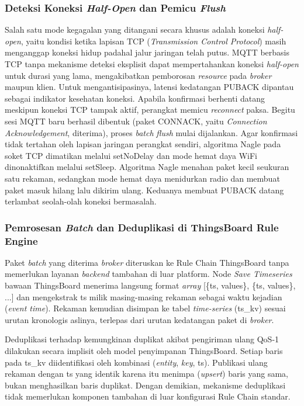 \subsubsection{Deteksi Koneksi \textit{Half-Open} dan Pemicu \textit{Flush}}

Salah satu mode kegagalan yang ditangani secara khusus adalah koneksi \textit{half-open},
yaitu kondisi ketika lapisan TCP (\textit{Transmission Control Protocol}) masih menganggap koneksi hidup padahal jalur jaringan
telah putus. MQTT berbasis TCP tanpa mekanisme deteksi eksplisit dapat mempertahankan
koneksi \textit{half-open} untuk durasi yang lama, mengakibatkan pemborosan \textit{resource} pada
\textit{broker} maupun klien. Untuk mengantisipasinya, latensi kedatangan PUBACK dipantau sebagai
indikator kesehatan koneksi. Apabila konfirmasi berhenti datang meskipun koneksi TCP
tampak aktif, perangkat memicu \textit{reconnect} paksa. Begitu sesi MQTT baru berhasil
dibentuk (paket CONNACK, yaitu \textit{Connection Acknowledgement}, diterima), proses \textit{batch} \textit{flush} mulai
dijalankan. Agar konfirmasi tidak tertahan oleh lapisan jaringan perangkat sendiri,
algoritma Nagle pada soket TCP dimatikan melalui setNoDelay dan mode hemat daya WiFi
dinonaktifkan melalui setSleep. Algoritma Nagle menahan paket kecil seukuran satu
rekaman, sedangkan mode hemat daya menidurkan radio dan membuat paket masuk hilang
lalu dikirim ulang. Keduanya membuat PUBACK datang terlambat seolah-olah
koneksi bermasalah.

\subsubsection{Pemrosesan \textit{Batch} dan Deduplikasi di ThingsBoard Rule Engine}

Paket \textit{batch} yang diterima \textit{broker} diteruskan ke Rule Chain ThingsBoard tanpa memerlukan
layanan \textit{backend} tambahan di luar platform. Node \textit{Save Timeseries} bawaan
ThingsBoard menerima langsung format \textit{array} [\{ts, values\}, \{ts, values\}, ...]
dan mengekstrak ts milik masing-masing rekaman sebagai waktu kejadian (\textit{event time}).
Rekaman kemudian disimpan ke tabel \textit{time-series} (ts\_kv) sesuai urutan kronologis aslinya, terlepas
dari urutan kedatangan paket di \textit{broker}.

Deduplikasi terhadap kemungkinan duplikat akibat pengiriman ulang QoS-1 dilakukan secara
implisit oleh model penyimpanan ThingsBoard. Setiap baris pada ts\_kv
diidentifikasi oleh kombinasi (\textit{entity}, \textit{key}, ts). Publikasi
ulang rekaman dengan ts yang identik karena itu menimpa (\textit{upsert}) baris yang sama, bukan
menghasilkan baris duplikat. Dengan demikian, mekanisme deduplikasi tidak memerlukan
komponen tambahan di luar konfigurasi Rule Chain standar.

